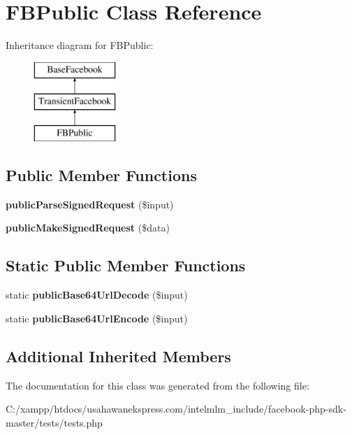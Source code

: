 \hypertarget{class_f_b_public}{\section{F\-B\-Public Class Reference}
\label{class_f_b_public}
}
Inheritance diagram for F\-B\-Public\-:\begin{figure}[H]
\begin{center}
\leavevmode
\includegraphics[height=3.000000cm]{class_f_b_public}
\end{center}
\end{figure}
\subsection*{Public Member Functions}
\begin{DoxyCompactItemize}
\item 
\hypertarget{class_f_b_public_a1ef8d6334375029145caa9ae775000bf}{{\bfseries public\-Parse\-Signed\-Request} (\$input)}\label{class_f_b_public_a1ef8d6334375029145caa9ae775000bf}

\item 
\hypertarget{class_f_b_public_a5d92d783b54171db9bfeb3e3e7b8312d}{{\bfseries public\-Make\-Signed\-Request} (\$data)}\label{class_f_b_public_a5d92d783b54171db9bfeb3e3e7b8312d}

\end{DoxyCompactItemize}
\subsection*{Static Public Member Functions}
\begin{DoxyCompactItemize}
\item 
\hypertarget{class_f_b_public_af32ca0f44b61155b011ecebc3e92fa5c}{static {\bfseries public\-Base64\-Url\-Decode} (\$input)}\label{class_f_b_public_af32ca0f44b61155b011ecebc3e92fa5c}

\item 
\hypertarget{class_f_b_public_a79c4697e9eceb90c6e1989f8325c4230}{static {\bfseries public\-Base64\-Url\-Encode} (\$input)}\label{class_f_b_public_a79c4697e9eceb90c6e1989f8325c4230}

\end{DoxyCompactItemize}
\subsection*{Additional Inherited Members}


The documentation for this class was generated from the following file\-:\begin{DoxyCompactItemize}
\item 
C\-:/xampp/htdocs/usahawanekspress.\-com/intelmlm\-\_\-include/facebook-\/php-\/sdk-\/master/tests/tests.\-php\end{DoxyCompactItemize}
